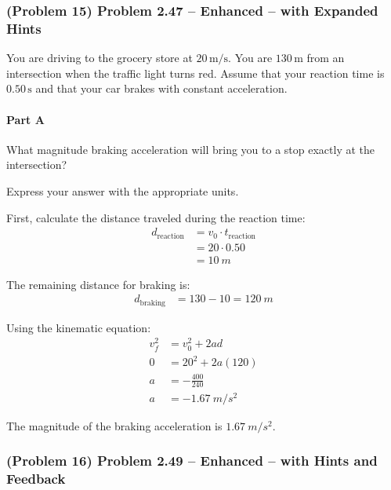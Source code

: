 \newpage

\subsubsection{(Problem 15) Problem 2.47 -- Enhanced -- with Expanded Hints}

You are driving to the grocery store at \( 20 \, \mathrm{m/s} \). You are \( 130 \, \mathrm{m} \) from an intersection when the traffic light turns red. Assume that your reaction time is \( 0.50 \, \mathrm{s} \) and that your car brakes with constant acceleration.

\paragraph{Part A}
What magnitude braking acceleration will bring you to a stop exactly at the intersection?

Express your answer with the appropriate units.

\begin{solution}
	First, calculate the distance traveled during the reaction time:
	\begin{align*}
		d_{\mathrm{reaction}} &= v_0 \cdot t_{\mathrm{reaction}} \\
		&= 20 \cdot 0.50 \\
		&= \SI{10}{m}
	\end{align*}

	The remaining distance for braking is:
	\begin{align*}
		d_{\mathrm{braking}} &= 130 - 10 = \SI{120}{m}
	\end{align*}

	Using the kinematic equation:
	\begin{align*}
		v_f^2 &= v_0^2 + 2ad \\
		0 &= 20^2 + 2a(120) \\
		a &= -\frac{400}{240} \\
		a &= -\SI{1.67}{m/s^2}
	\end{align*}

	The magnitude of the braking acceleration is \( \boxed{\SI{1.67}{m/s^2}} \).
\end{solution}

\newpage

\subsubsection{(Problem 16) Problem 2.49 -- Enhanced -- with Hints and Feedback}


